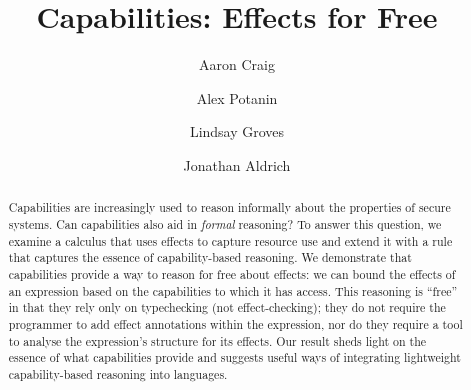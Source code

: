\documentclass[runningheads]{llncs}
\begin{document}
\title{Capabilities: Effects for Free}

\author{Aaron Craig \and Alex Potanin \and Lindsay Groves \and Jonathan Aldrich}



\maketitle

\begin{abstract}
Capabilities are increasingly used to reason informally about the properties of secure systems.  Can capabilities also aid in \textit{formal} reasoning?  To answer this question, we examine a calculus that uses effects to capture resource use and extend it with a rule that captures the essence of capability-based reasoning.  We demonstrate that capabilities provide a way to reason for free about effects: we can bound the effects of an expression based on the capabilities to which it has access.  This reasoning is ``free'' in that they rely only on typechecking (not effect-checking); they do not require the programmer to add effect annotations within the expression, nor do they require a tool to analyse the expression's structure for its effects.  Our result sheds light on the essence of what capabilities provide and suggests useful ways of integrating lightweight capability-based reasoning into languages.

\end{abstract}









\end{document}
